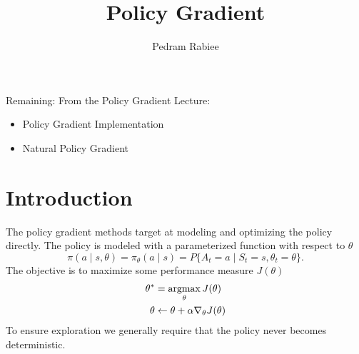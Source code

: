 \documentclass{article}
\title{Policy Gradient}
\author{Pedram Rabiee}
\begin{document}
\begin{titlepage}
\thispagestyle{empty}
\maketitle

\tableofcontents

Remaining:
From the Policy Gradient Lecture:
\begin{itemize}
    \item Policy Gradient Implementation
    \item Natural Policy Gradient
\end{itemize}
\end{titlepage}



\section{Introduction}
The policy gradient methods target at modeling and optimizing the policy directly. The policy is modeled with a parameterized function with respect to $\theta$
\begin{equation*}
    \pi(a \mid s,\theta) = \pi_\theta(a \mid s) = P\{A_t = a \mid S_t = s,\theta_t = \theta\}.
\end{equation*}
The objective is to maximize some performance measure $J(\theta)$
\begin{align*}
    \theta^* &= \operatorname*{argmax}_\theta J(\theta)\\
    \theta &\gets \theta + \alpha \nabla_\theta J(\theta)
\end{align*}
To ensure exploration we generally require that the policy never becomes deterministic.
\end{document}
